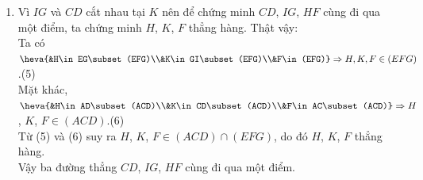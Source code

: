 \begin{bt}
\begin{vd}[CTST]
{\begin{enumerate}
			Từ (3) và (4) suy ra $FK=(EFG)\cap (ACD)$.
			\item Vì $IG$ và $CD$ cắt nhau tại $K$ nên để chứng minh $CD$, $IG$, $HF$ cùng đi qua một điểm, ta chứng minh $H$, $K$, $F$ thẳng hàng. Thật vậy:\\
			Ta có $\heva{&H\in EG\subset (EFG)\\&K\in GI\subset (EFG)\\&F\in (EFG)}\Rightarrow H, K, F\in (EFG)$.\hfill (5) \\
			Mặt khác, $\heva{&H\in AD\subset (ACD)\\&K\in CD\subset (ACD)\\&F\in AC\subset (ACD)}\Rightarrow H$, $K$, $F\in (ACD)$.\hfill (6) \\
			Từ (5) và (6) suy ra $H$, $K$, $F\in (ACD)\cap (EFG)$, do đó $H$, $K$, $F$ thẳng hàng.\\
			Vậy ba đường thẳng $CD$, $IG$, $HF$ cùng đi qua một điểm. 
		\end{enumerate}	
	}
\end{vd}


\end{bt}
